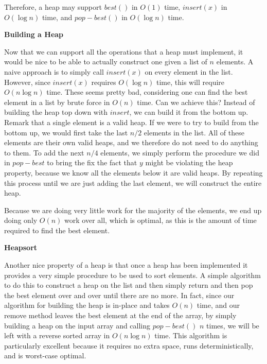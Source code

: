 Therefore, a heap may support $best()$ in $O(1)$ time, $insert(x)$ 
in $O(\log n)$ time, and $pop-best()$ in $O(\log n)$ time.

{\bf Building a Heap}

Now that we can support all the operations that a heap must implement,
it would be nice to be able to actually construct one given a list of $n$
elements. A naive approach is to simply call $insert(x)$ on every element
in the list. However, since $insert(x)$ requires $O(\log n)$ time, this will
require $O(n \log n)$ time. These seems pretty bad, considering one can find
the best element in a list by brute force in $O(n)$ time. Can we achieve this?
Instead of building the heap top down with $insert$, we can build it from the
bottom up. Remark that a single element is a valid heap. If we were to try to
build from the bottom up, we would first take the last $n/2$ elements in the
list. All of these elements are their own valid heaps, and we therefore do not
need to do anything to them. To add the next $n/4$ elements, we simply perform
the procedure we did in $pop-best$ to bring the fix the fact that $y$ might
be violating the heap property, because we know all the elements below it are
valid heaps. By repeating this process until we are just adding the last
element, we will construct the entire heap. 

Because we are doing very little work for the majority of the elements, we end
up doing only $O(n)$ work over all, which is optimal, as this is the amount of
time required to find the best element.

{\bf Heapsort}

Another nice property of a heap is that once a heap has been implemented
it provides a very simple procedure to be used to sort elements.
A simple algorithm to do this to construct a heap on the list and then simply
return and then pop the best element over and over until there are no more.
In fact, since our algorithm for building the heap is in-place and takes $O(n)$
time, and our remove method leaves the best element at the end of the array,
by simply building a heap on the input array and calling $pop-best()$ $n$ times,
we will be left with a reverse sorted array in $O(n \log n)$ time. 
This algorithm is particularly excellent because it requires no extra space,
runs deterministically, and is worst-case optimal.


